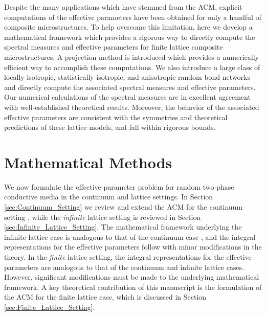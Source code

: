 \documentclass{cmslatex}
\begin{document}
Despite the many applications which have stemmed from the ACM,
explicit computations of the effective parameters have been obtained
for only a handful of composite microstructures. To help overcome
this limitation, here we develop a mathematical framework which
provides a rigorous way to directly compute the spectral measures and
effective parameters for finite lattice composite microstructures. A
projection method is introduced which provides a numerically efficient
way to accomplish these computations. We also introduce a large class
of locally isotropic, statistically isotropic, and anisotropic random
bond networks and directly compute the associated spectral measures
and effective parameters. Our numerical calculations of the spectral
measures are in excellent agreement with well-established theoretical
results. Moreover, the behavior of the associated effective parameters
are consistent with the symmetries and theoretical predictions of
these lattice models, and fall within rigorous bounds.     

\section{Mathematical Methods}\label{sec:Mathematical_Methods} 
%
We now formulate the effective parameter problem for random
two-phase conductive media in the continuum and lattice
settings. In Section \ref{sec:Continuum_Setting} we review and extend
the ACM for the continuum setting \cite{Golden:CMP-473}, while the
\emph{infinite} 
lattice setting \cite{Bruno:JSP-365,Golden:CMP-467} is reviewed in
Section \ref{sec:Infinite_Lattice_Setting}. The mathematical framework
underlying the infinite lattice case is analogous to that of
the continuum case \cite{Bruno:JSP-365}, and the integral
representations for the effective parameters follow with minor
modifications in the theory. In the \emph{finite} lattice setting, the
integral representations for the effective parameters are analogous to
that of the continuum and infinite lattice cases. However,
significant modifications must be made to the underlying mathematical
framework. A key theoretical contribution of this manuscript is the
formulation of the ACM for the finite lattice case, which is discussed
in Section \ref{sec:Finite_Lattice_Setting}.  
\end{document}
